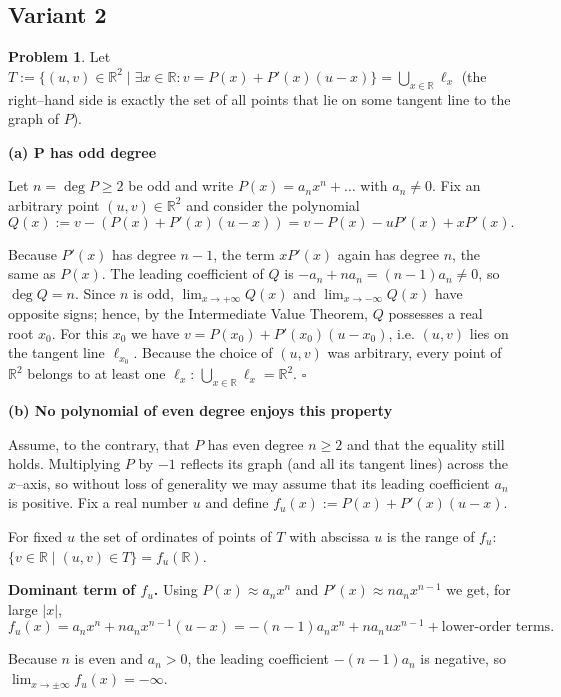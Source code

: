 \documentclass[12pt,a4paper]{article}
\theoremstyle{definition}
\newtheorem{problem}{Problem}
\begin{document}
    \subsection{Variant 2}
    \begin{problem}
        Let $T := \{(u , v) \in \mathbb{R}^2 \mid \exists x\in\mathbb{R} : v = P(x)+P'(x)(u-x)\} = \bigcup_{x\in\mathbb{R}} \ell_x$ (the right--hand side is exactly the set of all points that lie on some tangent line to the graph of $P$).

        \textbf{(a) P has odd degree}

        Let $n = \deg P \geq 2$ be odd and write $P(x)=a_nx^n+\ldots$ with $a_n\neq0$. Fix an arbitrary point $(u , v)\in\mathbb{R}^2$ and consider the polynomial
        \[Q(x) := v - (P(x)+P'(x)(u-x)) = v -P(x) -uP'(x)+xP'(x).\]

        Because $P'(x)$ has degree $n-1$, the term $xP'(x)$ again has degree $n$, the same as $P(x)$. The leading coefficient of $Q$ is $-a_n + n a_n = (n-1)a_n \neq 0$, so $\deg Q = n$. Since $n$ is odd, $\lim_{x\to+\infty} Q(x)$ and $\lim_{x\to-\infty} Q(x)$ have opposite signs; hence, by the Intermediate Value Theorem, $Q$ possesses a real root $x_0$. For this $x_0$ we have $v = P(x_0)+P'(x_0)(u-x_0)$, i.e. $(u , v)$ lies on the tangent line $\ell_{x_0}$. Because the choice of $(u , v)$ was arbitrary, every point of $\mathbb{R}^2$ belongs to at least one $\ell_x$: $\bigcup_{x\in\mathbb{R}} \ell_x = \mathbb{R}^2$. $\square$

        \textbf{(b) No polynomial of even degree enjoys this property}

        Assume, to the contrary, that $P$ has even degree $n\geq2$ and that the equality still holds. Multiplying $P$ by $-1$ reflects its graph (and all its tangent lines) across the $x$--axis, so without loss of generality we may assume that its leading coefficient $a_n$ is positive. Fix a real number $u$ and define $f_u(x) := P(x)+P'(x)(u-x)$.

        For fixed $u$ the set of ordinates of points of $T$ with abscissa $u$ is the range of $f_u$:
        $\{ v \in \mathbb{R} \mid (u , v) \in T \} = f_u(\mathbb{R})$.

        \textbf{Dominant term of $f_u$.} Using $P(x)\approx a_nx^n$ and $P'(x)\approx n a_nx^{n-1}$ we get, for large $|x|$,
        \[f_u(x) = a_nx^n + n a_nx^{n-1}(u-x) = -(n-1)a_nx^n + n a_nu x^{n-1} + \text{lower-order terms}.\]

        Because $n$ is even and $a_n>0$, the leading coefficient $-(n-1)a_n$ is negative, so $\lim_{x\to\pm\infty} f_u(x) = -\infty$.


\end{problem}
\end{document}
